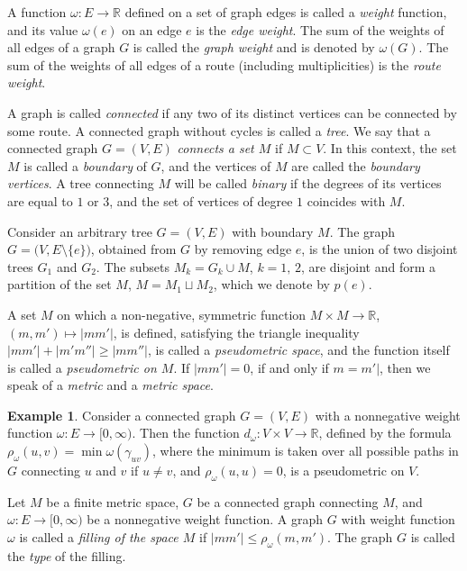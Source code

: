 \documentclass[10pt]{article}
\theoremstyle{plain}
\theoremstyle{definition}
\newtheorem{examp}[thm]{Example}
\def\:{\colon}
\def\g{\gamma}
\def\om{\omega}
\newcommand{\R}{{\mathbb R}}
\begin{document}
A function $\om\:E\to\R$ defined on a set of graph edges is called a \emph{weight\/} function, and its value $\om(e)$ on an edge $e$ is the \emph{edge weight}. The sum of the weights of all edges of a graph $G$ is called the \emph{graph weight\/} and is denoted by $\om(G)$. The sum of the weights of all edges of a route (including multiplicities) is the \emph{route weight}.

A graph is called \emph{connected\/} if any two of its distinct vertices can be connected by some route. A connected graph without cycles is called a \emph{tree}. We say that a connected graph $G=(V,E)$ \emph{connects a set $M$} if $M\subset V$. In this context, the set $M$ is called a \emph{boundary\/} of $G$, and the vertices of $M$ are called the \emph{boundary vertices}. A tree connecting $M$ will be called \emph{binary\/} if the degrees of its vertices are equal to $1$ or $3$, and the set of vertices of degree $1$ coincides with $M$.

Consider an arbitrary tree $G=(V,E)$ with boundary $M$. The graph $G=\big(V,E\setminus\{e\}\big)$, obtained from $G$ by removing edge $e$, is the union of two disjoint trees $G_1$ and $G_2$. The subsets $M_k=G_k\cup M$, $k=1,\,2$, are disjoint and form a partition of the set $M$, $M=M_1\sqcup M_2$, which we denote by $p(e)$.

A set $M$ on which a non-negative, symmetric function $M\times M\to\R$, $(m,m')\mapsto|mm'|$, is defined, satisfying the triangle inequality $|mm'|+|m'm''|\ge|mm''|$, is called a \emph{pseudometric space}, and the function itself is called a \emph{pseudometric on $M$}. If $|mm'|=0$, if and only if $m=m'|$, then we speak of a \emph{metric\/} and a \emph{metric space}.

\begin{examp}
Consider a connected graph $G=(V,E)$ with a nonnegative weight function $\om\:E\to[0,\infty)$. Then the function $d_\om\:V\times V\to\R$, defined by the formula $\rho_\om(u,v)=\min\om(\g_{uv})$, where the minimum is taken over all possible paths in $G$ connecting $u$ and $v$ if $u\neq v$, and $\rho_\om(u,u)=0$, is a pseudometric on $V$.
\end{examp}

Let $M$ be a finite metric space, $G$ be a connected graph connecting $M$, and $\om\:E\to[0,\infty)$ be a nonnegative weight function. A graph $G$ with weight function $\om$ is called a \emph{filling of the space $M$} if $|mm'|\le\rho_\om(m,m')$. The graph $G$ is called the \emph{type\/} of the filling.
\end{document}
